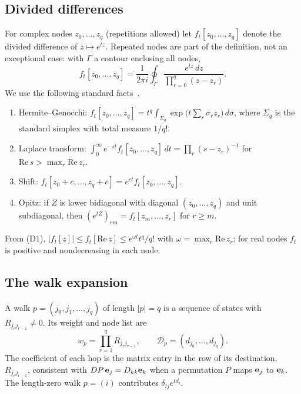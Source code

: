 \subsection{Divided differences}
For complex nodes $z_0,\dots,z_q$ (repetitions allowed) let $f_t[z_0,\dots,z_q]$ denote the divided difference of $z\mapsto e^{tz}$. Repeated nodes are part of the definition, not an exceptional case: with $\Gamma$ a contour enclosing all nodes,
\begin{equation}\label{eq:dd_contour}
f_t[z_0,\dots,z_q]=\frac{1}{2\pi i}\oint_\Gamma \frac{e^{tz}\,dz}{\prod_{r=0}^q (z-z_r)} .
\end{equation}
We use the following standard facts~\cite{deboor2005,higham2008,opitz1964}.
\begin{enumerate}
\item[(D1)] Hermite--Genocchi: $f_t[z_0,\dots,z_q]=t^q\int_{\Sigma_q}\exp\!\big(t\sum_r\sigma_r z_r\big)\,d\sigma$, where $\Sigma_q$ is the standard simplex with total measure $1/q!$.
\item[(D2)] Laplace transform: $\int_0^\infty e^{-st}f_t[z_0,\dots,z_q]\,dt=\prod_r (s-z_r)^{-1}$ for $\mathrm{Re}\,s>\max_r\mathrm{Re}\,z_r$.
\item[(D3)] Shift: $f_t[z_0+c,\dots,z_q+c]=e^{ct}f_t[z_0,\dots,z_q]$.
\item[(D4)] Opitz: if $Z$ is lower bidiagonal with diagonal $(z_0,\dots,z_q)$ and unit subdiagonal, then $(e^{tZ})_{rm}=f_t[z_m,\dots,z_r]$ for $r\ge m$.
\end{enumerate}
From (D1), $|f_t[z]|\le f_t[\mathrm{Re}\,z]\le e^{\omega t}t^q/q!$ with $\omega=\max_r\mathrm{Re}\,z_r$; for real nodes $f_t$ is positive and nondecreasing in each node.

\subsection{The walk expansion}
A walk $p=(j_0,j_1,\dots,j_q)$ of length $|p|=q$ is a sequence of states with $R_{j_rj_{r-1}}\neq0$. Its weight and node list are
\begin{equation}
w_p=\prod_{r=1}^q R_{j_r j_{r-1}},\qquad \mathcal{D}_p=(d_{j_0},\dots,d_{j_q}).
\end{equation}
The coefficient of each hop is the matrix entry in the row of its destination, $R_{j_rj_{r-1}}$, consistent with $DP\,{\bf e}_j=D_{kk}{\bf e}_k$ when a permutation $P$ maps ${\bf e}_j$ to ${\bf e}_k$. The length-zero walk $p=(i)$ contributes $\delta_{ij}e^{td_i}$.

